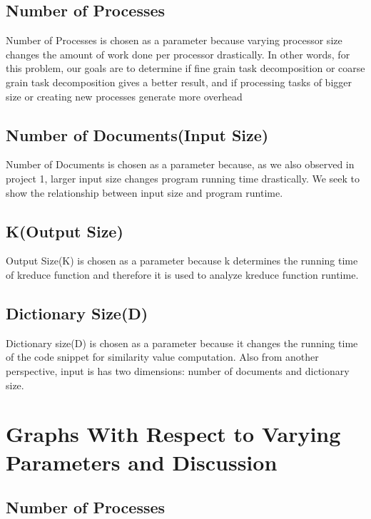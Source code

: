 \documentclass{article}
\begin{document}
\subsection{Number of Processes}
\qquad Number of Processes is chosen as a parameter because varying processor size changes the amount of work done per processor drastically. In other words, for this problem, our goals are to determine if fine grain task decomposition or coarse grain task decomposition gives a better result, and if processing tasks of bigger size or creating new processes generate more overhead
\subsection{Number of Documents(Input Size)}
\qquad Number of Documents is chosen as a parameter because, as we also observed in project 1, larger input size changes program running time drastically. We seek to show the relationship between input size and program runtime.
\subsection{K(Output Size)}
\qquad Output Size(K) is chosen as a parameter because k determines the running time of kreduce function and therefore it is used to analyze kreduce function runtime.
\subsection{Dictionary Size(D)}
\qquad Dictionary size(D) is chosen as a parameter because it changes the running time of the code snippet for similarity value computation. Also from another perspective, input is has two dimensions: number of documents and dictionary size.

\section{Graphs With Respect to Varying Parameters and Discussion}
\subsection{Number of Processes}
\end{document}
